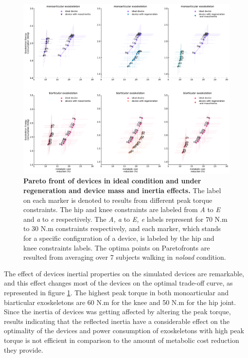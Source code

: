 \documentclass[10pt,letterpaper]{article}
\begin{document}
\begin{figure}[ht]   
	\centering
	\includegraphics[width=\linewidth]{Pareto_Mass_Regenration_Figures/PaperFigure_Pareto_Comparison.pdf}
	\vspace{1mm}
	\caption{{\small\textbf{Pareto front of devices in ideal condition and under regeneration and device mass and inertia effects.} The label on each marker is denoted to results from different peak torque constraints. The hip and knee constraints are labeled from {\it A} to {\it E} and {\it a} to {\it e} respectively. The {\it A, a} to {\it E, e} labels represent for 70 N.m to 30 N.m constraints respectively, and each marker, which stands for a specific configuration of a device, is labeled by the hip and knee constraints labels. The optima points on Paretofronts are resulted from averaging over 7 subjects walking in {\it noload} condition.}}
	\label{Fig_Paretofronts_Mass_Regeneration_Effect_Comparison}
\end{figure}
\vspace{2mm}
The effect of devices inertial properties on the simulated devices are remarkable, and this effect changes most of the devices on the optimal trade-off curve, as represented in figure \ref{Fig_Paretofronts_Mass_Regeneration_Effect_Comparison}.  The highest peak torque in both monoarticular and biarticular exoskeletons are 60 N.m for the knee and 50 N.m for the hip joint. Since the inertia of devices was getting affected by altering the peak torque, results indicating that the reflected inertia have a considerable effect on the optimality of the devices and power consumption of exoskeletons with high peak torque is not efficient in comparison to the amount of metabolic cost reduction they provide.\\ 
\end{document}
